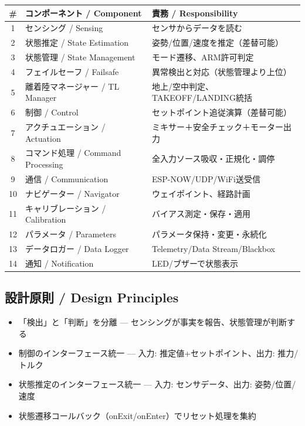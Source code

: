 \documentclass[a4paper,11pt]{article}
\newcommand{\thead}[1]{\textbf{\color{accentdark}#1}}
\begin{document}
\begin{table}[h]
\centering
\begin{tabular}{@{}cll@{}}
\toprule
\thead{\#} & \thead{コンポーネント / Component} & \thead{責務 / Responsibility} \\
\midrule
1 & センシング / Sensing & センサからデータを読む \\
2 & 状態推定 / State Estimation & 姿勢/位置/速度を推定（差替可能） \\
3 & 状態管理 / State Management & モード遷移、ARM許可判定 \\
4 & フェイルセーフ / Failsafe & 異常検出と対応（状態管理より上位） \\
5 & 離着陸マネージャー / TL Manager & 地上/空中判定、TAKEOFF/LANDING統括 \\
6 & 制御 / Control & セットポイント追従演算（差替可能） \\
7 & アクチュエーション / Actuation & ミキサー＋安全チェック＋モーター出力 \\
8 & コマンド処理 / Command Processing & 全入力ソース吸収・正規化・調停 \\
9 & 通信 / Communication & ESP-NOW/UDP/WiFi送受信 \\
10 & ナビゲーター / Navigator & ウェイポイント、経路計画 \\
11 & キャリブレーション / Calibration & バイアス測定・保存・適用 \\
12 & パラメータ / Parameters & パラメータ保持・変更・永続化 \\
13 & データロガー / Data Logger & Telemetry/Data Stream/Blackbox \\
14 & 通知 / Notification & LED/ブザーで状態表示 \\
\bottomrule
\end{tabular}
\end{table}

\subsection{設計原則 / Design Principles}

\begin{itemize}[leftmargin=*, itemsep=2pt]
    \item 「検出」と「判断」を分離 --- センシングが事実を報告、状態管理が判断する
    \item 制御のインターフェース統一 --- 入力: 推定値+セットポイント、出力: 推力/トルク
    \item 状態推定のインターフェース統一 --- 入力: センサデータ、出力: 姿勢/位置/速度
    \item 状態遷移コールバック（onExit/onEnter）でリセット処理を集約
\end{itemize}
\end{document}
